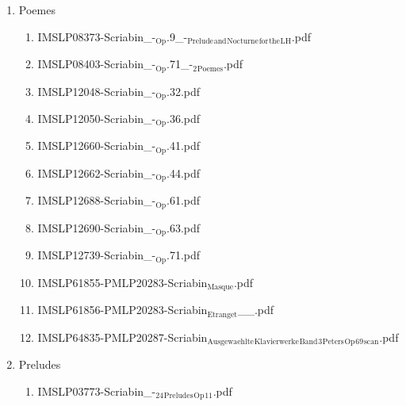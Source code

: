 \documentclass[11pt]{article}
\begin{document}
\begin{enumerate}
\item Poemes
\label{sec-1-1-1-1-44-63-12}
\begin{enumerate}
\item IMSLP08373-Scriabin\_-$_{\text{Op}}$.9\_-$_{\text{Prelude}}$$_{\text{and}}$$_{\text{Nocturne}}$$_{\text{for}}$$_{\text{the}}$$_{\text{LH}}$.pdf
\label{sec-1-1-1-1-44-63-12-1}

\item IMSLP08403-Scriabin\_-$_{\text{Op}}$.71\_-$_{\text{2}}$$_{\text{Poemes}}$.pdf
\label{sec-1-1-1-1-44-63-12-2}

\item IMSLP12048-Scriabin\_-$_{\text{Op}}$.32.pdf
\label{sec-1-1-1-1-44-63-12-3}

\item IMSLP12050-Scriabin\_-$_{\text{Op}}$.36.pdf
\label{sec-1-1-1-1-44-63-12-4}

\item IMSLP12660-Scriabin\_-$_{\text{Op}}$.41.pdf
\label{sec-1-1-1-1-44-63-12-5}

\item IMSLP12662-Scriabin\_-$_{\text{Op}}$.44.pdf
\label{sec-1-1-1-1-44-63-12-6}

\item IMSLP12688-Scriabin\_-$_{\text{Op}}$.61.pdf
\label{sec-1-1-1-1-44-63-12-7}

\item IMSLP12690-Scriabin\_-$_{\text{Op}}$.63.pdf
\label{sec-1-1-1-1-44-63-12-8}

\item IMSLP12739-Scriabin\_-$_{\text{Op}}$.71.pdf
\label{sec-1-1-1-1-44-63-12-9}

\item IMSLP61855-PMLP20283-Scriabin$_{\text{Masque}}$.pdf
\label{sec-1-1-1-1-44-63-12-10}

\item IMSLP61856-PMLP20283-Scriabin$_{\text{Etranget}}$\_\_.pdf
\label{sec-1-1-1-1-44-63-12-11}

\item IMSLP64835-PMLP20287-Scriabin$_{\text{Ausgewaehlte}}$$_{\text{Klavierwerke}}$$_{\text{Band}}$$_{\text{3}}$$_{\text{Peters}}$$_{\text{Op}}$$_{\text{69}}$$_{\text{scan}}$.pdf
\label{sec-1-1-1-1-44-63-12-12}
\end{enumerate}

\item Preludes
\label{sec-1-1-1-1-44-63-13}
\begin{enumerate}
\item IMSLP03773-Scriabin\_-$_{\text{24}}$$_{\text{Preludes}}$$_{\text{Op}}$$_{\text{11}}$.pdf
\label{sec-1-1-1-1-44-63-13-1}


\end{enumerate}
\end{enumerate}
\end{document}
